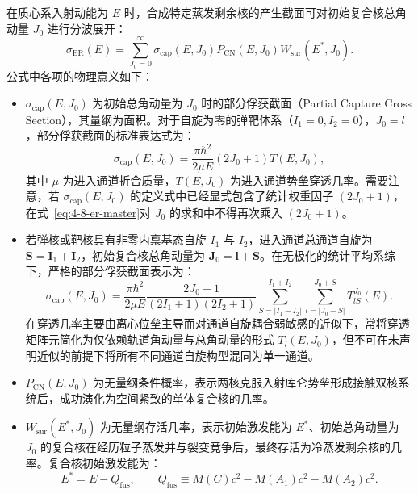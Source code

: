 在质心系入射动能为 $E$ 时，合成特定蒸发剩余核的产生截面可对初始复合核总角动量 $J_0$ 进行分波展开：
\begin{equation}\label{eq:4-8-er-master}
\sigma_{\mathrm{ER}}(E) = \sum_{J_0=0}^\infty \sigma_{\mathrm{cap}}(E, J_0) P_{\mathrm{CN}}(E, J_0) W_{\mathrm{sur}}(E^*, J_0).
\end{equation}
公式中各项的物理意义如下：
\begin{itemize}
\item $\sigma_{\mathrm{cap}}(E, J_0)$ 为初始总角动量为 $J_0$ 时的部分俘获截面（Partial Capture Cross Section），其量纲为面积。对于自旋为零的弹靶体系（$I_1 = 0, I_2 = 0$），$J_0 = l$，部分俘获截面的标准表达式为：
\begin{equation}\label{eq:4-8-sigma-cap-spin0}
\sigma_{\mathrm{cap}}(E, J_0) = \frac{\pi \hbar^2}{2\mu E} (2J_0 + 1) T(E, J_0),
\end{equation}
其中 $\mu$ 为进入通道折合质量，$T(E, J_0)$ 为进入通道势垒穿透几率。需要注意，若 $\sigma_{\mathrm{cap}}(E, J_0)$ 的定义式中已经显式包含了统计权重因子 $(2J_0 + 1)$，在式~\eqref{eq:4-8-er-master}对 $J_0$ 的求和中不得再次乘入 $(2J_0+1)$。
\item 若弹核或靶核具有非零内禀基态自旋 $I_1$ 与 $I_2$，进入通道总通道自旋为 $\mathbf{S} = \mathbf{I}_1 + \mathbf{I}_2$，初始复合核总角动量为 $\mathbf{J}_0 = \mathbf{l} + \mathbf{S}$。在无极化的统计平均系综下，严格的部分俘获截面表示为：
\begin{equation}\label{eq:4-8-sigma-cap-general-spin}
\sigma_{\mathrm{cap}}(E, J_0) = \frac{\pi \hbar^2}{2\mu E} \frac{2J_0 + 1}{(2I_1 + 1)(2I_2 + 1)} \sum_{S=|I_1 - I_2|}^{I_1 + I_2} \sum_{l=|J_0-S|}^{J_0+S} T_{lS}^{J_0}(E).
\end{equation}
在穿透几率主要由离心位垒主导而对通道自旋耦合弱敏感的近似下，常将穿透矩阵元简化为仅依赖轨道角动量与总角动量的形式 $T_l(E, J_0)$，但不可在未声明近似的前提下将所有不同通道自旋构型混同为单一通道。
\item $P_{\mathrm{CN}}(E, J_0)$ 为无量纲条件概率，表示两核克服入射库仑势垒形成接触双核系统后，成功演化为空间紧致的单体复合核的几率。
\item $W_{\mathrm{sur}}(E^*, J_0)$ 为无量纲存活几率，表示初始激发能为 $E^*$、初始总角动量为 $J_0$ 的复合核在经历粒子蒸发并与裂变竞争后，最终存活为冷蒸发剩余核的几率。复合核初始激发能为：
\begin{equation}\label{eq:4-8-excitation-energy-def}
E^* = E - Q_{\mathrm{fus}}, \qquad Q_{\mathrm{fus}} \equiv M(C)c^2 - M(A_1)c^2 - M(A_2)c^2.
\end{equation}
\end{itemize}

